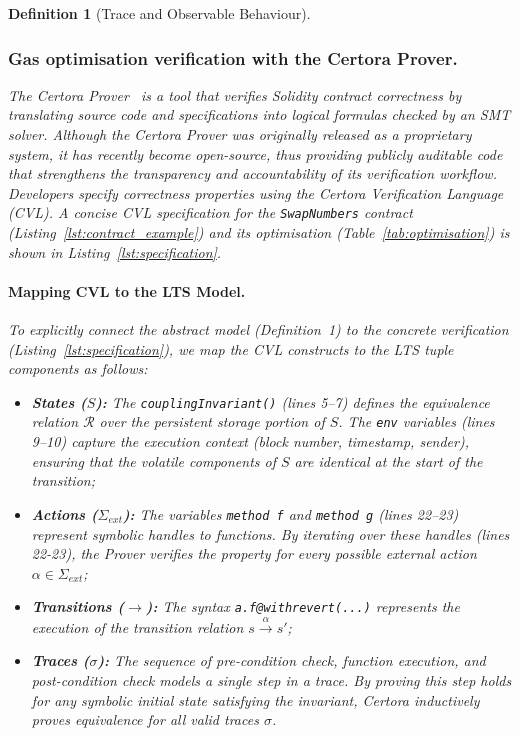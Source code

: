 \documentclass[manuscript,screen,review]{acmart}
\newtheorem{definition}{Definition}
\begin{document}
\begin{definition}[Trace and Observable Behaviour]
\subsubsection*{Gas optimisation verification with the Certora Prover.}

The Certora Prover~\cite{certora2023} is a tool that verifies Solidity contract correctness by translating source code and specifications into logical formulas checked by an SMT solver. Although the Certora Prover was originally released as a proprietary system, it has recently become open-source, thus providing publicly auditable code that strengthens the transparency and accountability of its verification workflow. Developers specify correctness properties using the Certora Verification Language (CVL). A concise CVL specification for the \texttt{SwapNumbers} contract (Listing~\ref{lst:contract_example}) and its optimisation (Table~\ref{tab:optimisation}) is shown in Listing~\ref{lst:specification}.

\paragraph{Mapping CVL to the LTS Model.}
To explicitly connect the abstract model (Definition~1) to the concrete verification (Listing~\ref{lst:specification}), we map the CVL constructs to the LTS tuple components as follows:
\begin{itemize}
    \item \textbf{States ($S$):} The \texttt{couplingInvariant()} (lines 5--7) defines the equivalence relation $\mathcal{R}$ over the persistent storage portion of $S$. The \texttt{env} variables (lines 9--10) capture the execution context (block number, timestamp, sender), ensuring that the volatile components of $S$ are identical at the start of the transition;
    \item \textbf{Actions ($\Sigma_{ext}$):} The variables \texttt{method f} and \texttt{method g} (lines 22--23) represent symbolic handles to functions. By iterating over these handles (lines 22-23), the Prover verifies the property for every possible external action $\alpha \in \Sigma_{ext}$;
    \item \textbf{Transitions ($\to$):} The syntax \texttt{a.f@withrevert(...)} represents the execution of the transition relation $s \xrightarrow{\alpha} s'$;
    \item \textbf{Traces ($\sigma$):} The sequence of pre-condition check, function execution, and post-condition check models a single step in a trace. By proving this step holds for \emph{any} symbolic initial state satisfying the invariant, Certora inductively proves equivalence for all valid traces $\sigma$.
\end{itemize}


\end{definition}
\end{document}
